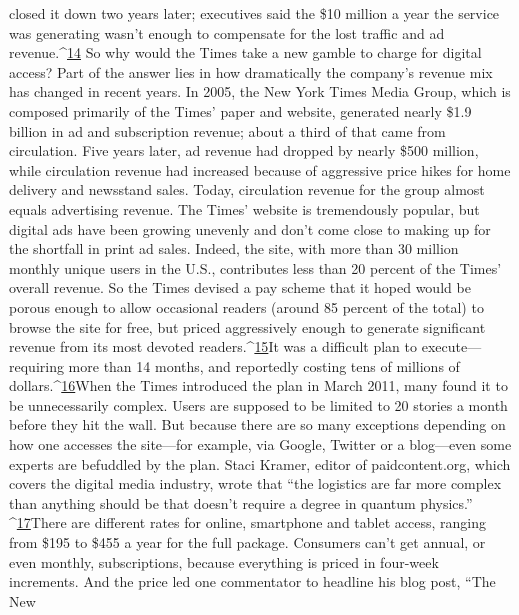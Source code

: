 closed it down two years later; executives said the \$10 million a year the service
was generating wasn't enough to compensate for the lost traffic and ad revenue.^{\href{#endnotes-chapter-5}{14}}%
So why would the Times take a new gamble to charge for digital access? Part
of the answer lies in how dramatically the company's revenue mix has changed
in recent years.
In 2005, the New York Times Media Group, which is composed primarily of
the Times' paper and website, generated nearly \$1.9 billion in ad and subscription
revenue; about a third of that came from circulation. Five years later, ad revenue
had dropped by nearly \$500 million, while circulation revenue had increased
because of aggressive price hikes for home delivery and newsstand sales. Today,
circulation revenue for the group almost equals advertising revenue.
The Times' website is tremendously popular, but digital ads have been growing
unevenly and don't come close to making up for the shortfall in print ad sales.
Indeed, the site, with more than 30 million monthly unique users in the U.S.,
contributes less than 20 percent of the Times' overall revenue.
So the Times devised a pay scheme that it hoped would be porous enough to
allow occasional readers (around 85 percent of the total) to browse the site for
free, but priced aggressively enough to generate significant revenue from its most
devoted readers.^{\href{#endnotes-chapter-5}{15}}It was a difficult plan to execute—requiring more than 14
months, and reportedly costing tens of millions of dollars.^{\href{#endnotes-chapter-5}{16}}When the Times introduced the plan in March 2011, many found it to be
unnecessarily complex. Users are supposed to be limited to 20 stories a month
before they hit the wall. But because there are so many exceptions depending
on how one accesses the site—for example, via Google, Twitter or a blog—even
some experts are befuddled by the plan. Staci Kramer, editor of paidcontent.org,
which covers the digital media industry, wrote that ``the logistics are far more
complex than anything should be that doesn't require a degree in quantum physics.''
^{\href{#endnotes-chapter-5}{17}}There are different rates for online, smartphone and tablet access, ranging
from \$195 to \$455 a year for the full package. Consumers can't get annual, or
even monthly, subscriptions, because everything is priced in four-week increments.
And the price led one commentator to headline his blog post, ``The New
